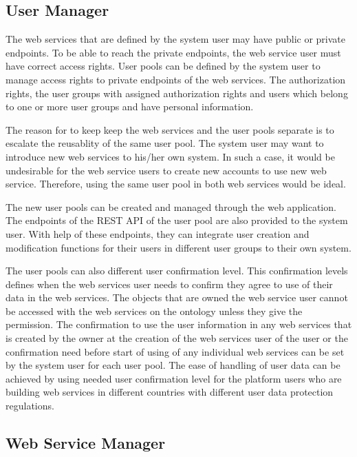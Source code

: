 \subsection{User Manager}

The web services that are defined by the system user may have public or private endpoints. To be able to reach the private endpoints, the web service user must have correct access rights. User pools can be defined by the system user to manage access rights to private endpoints of the web services. The authorization rights, the user groups with assigned authorization rights and users which belong to one or more user groups and have personal information. 

The reason for to keep keep the web services and the user pools separate is to escalate the reusablity of the same user pool. The system user may want to introduce new web services to his/her own system. In such a case, it would be undesirable for the web service users to create new accounts to use new web service. Therefore, using the same user pool in both web services would be ideal. 

The new user pools can be created and managed through the web application. The endpoints of the REST API of the user pool are also provided to the system user. With help of these endpoints, they can integrate user creation and modification functions for their users in different user groups to their own system. 

The user pools can also different user confirmation level. This confirmation levels defines when the web services user needs to confirm they agree to use of their data in the web services. The objects that are owned the web service user cannot be accessed with the web services on the ontology unless they give the permission. The confirmation to use the user information in any web services that is created by the owner at the creation of the web services user of the user or the confirmation need before start of using of any individual web services can be set by the system user for each user pool. The ease of handling of user data can be achieved by using needed user confirmation level for the platform users who are building web services in different countries with different user data protection regulations.


\subsection{Web Service Manager}

